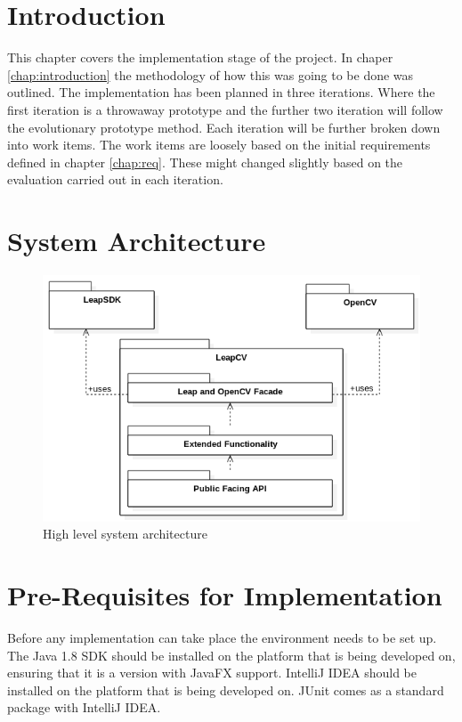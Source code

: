 \documentclass[11pt,oneside]{report}
\begin{document}
	\section{Introduction}
	This chapter covers the implementation stage of the project.
	In chaper \ref{chap:introduction} the methodology of how this was going to be done was outlined.
	The implementation has been planned in three iterations.
	Where the first iteration is a throwaway prototype and the further two iteration will follow the evolutionary prototype method.
	Each iteration will be further broken down into work items.
	The work items are loosely based on the initial requirements defined in chapter \ref{chap:req}.
	These might changed slightly based on the evaluation carried out in each iteration.
	\section{System Architecture}
	\begin{figure}[ht]
			\begin{center}
    			\includegraphics[scale=0.65]{system_architecture_2}
    			\caption{High level system architecture \protect {\label{fig:system_arch_1}}}
    		\end{center}
			\end{figure}	
			\clearpage
	\section{Pre-Requisites for Implementation}
		Before any implementation can take place the environment needs to be set up.
		The Java 1.8 SDK should be installed on the platform that is being developed on, ensuring that it is a version with JavaFX support.
		IntelliJ IDEA should be installed on the platform that is being developed on.
		JUnit comes as a standard package with IntelliJ IDEA.
		
\end{document}
